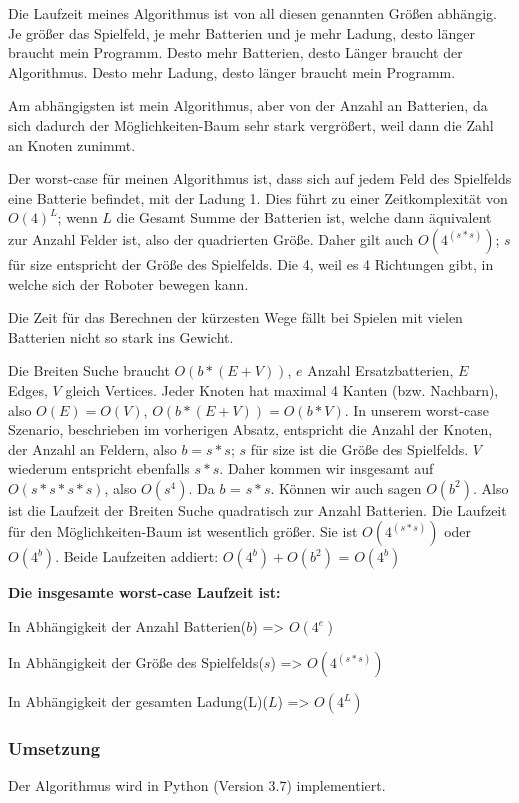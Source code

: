 \documentclass[a4paper,12pt,arial]{scrartcl}
\begin{document}
Die Laufzeit meines Algorithmus ist von all diesen genannten Größen abhängig.
Je größer das Spielfeld, je mehr Batterien und je mehr Ladung, desto länger braucht mein Programm.
Desto mehr Batterien, desto Länger braucht der Algorithmus.
Desto mehr Ladung, desto länger braucht mein Programm.
\par
Am abhängigsten ist mein Algorithmus, aber von der Anzahl an Batterien, da sich dadurch der Möglichkeiten-Baum sehr stark vergrößert, weil dann die Zahl an Knoten zunimmt.
\par
Der worst-case für meinen Algorithmus ist, dass sich auf jedem Feld des Spielfelds eine Batterie befindet, mit der Ladung 1. Dies führt zu einer Zeitkomplexität von $O(4)^L$; wenn $L$ die Gesamt Summe der Batterien ist, welche dann äquivalent zur Anzahl Felder ist, also der quadrierten Größe. Daher gilt auch $O(4^(s*s))$; $s$für size entspricht der Größe des Spielfelds.
Die 4, weil es 4 Richtungen gibt, in welche sich der Roboter bewegen kann.
\par
Die Zeit für das Berechnen der kürzesten Wege fällt bei Spielen mit vielen Batterien nicht so stark ins Gewicht.\par
Die Breiten Suche braucht $O(b * (E + V))$, $e$ Anzahl Ersatzbatterien, $E$ Edges, $V$ gleich Vertices. Jeder Knoten hat maximal 4 Kanten (bzw. Nachbarn), also $O(E) = O(V)$, $O(b * (E+V)) = O(b * V)$. In unserem worst-case Szenario, beschrieben im vorherigen Absatz, entspricht die Anzahl der Knoten, der Anzahl an Feldern, also $b=s*s$; $s$ für size ist die Größe des Spielfelds.
$V$ wiederum entspricht ebenfalls $s*s$. Daher kommen wir insgesamt auf $O(s*s*s*s)$,
also $O(s^4)$. Da $b$ = $s * s$. Können wir auch sagen $O(b^2)$. Also ist die Laufzeit der Breiten Suche quadratisch zur Anzahl Batterien.
Die Laufzeit für den Möglichkeiten-Baum ist wesentlich größer.
Sie ist $O(4^{(s*s)})$ oder $O(4^b)$.
Beide Laufzeiten addiert: $O(4^b) + O(b^2)$ = $O(4^b)$
\par
\textbf{Die insgesamte worst-case Laufzeit ist:}
\begin{compactitem}
\item In Abhängigkeit der Anzahl Batterien($b$) => \texttt{$O(4^e)$}
\item In Abhängigkeit der Größe des Spielfelds($s$) => \texttt{$O(4^{(s*s)})$}
\item In Abhängigkeit der gesamten Ladung(L)($L$) => \texttt{$O(4^L)$}
\end{compactitem}
\subsubsection{Umsetzung}
Der Algorithmus wird in Python (Version 3.7) implementiert.
\end{document}
